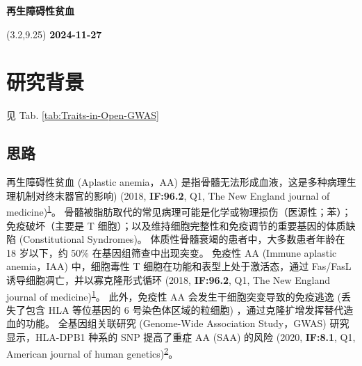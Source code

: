 \documentclass[
]{article}
\author{}
\date{\vspace{-2.5em}}
\begin{document}
\begin{titlepage} 
\begin{center} \textbf{\huge 再生障碍性贫血}
\vspace{4em} \begin{textblock}{10}(3.2,9.25)
\huge \textbf{\textcolor{black}{2024-11-27}}
\end{textblock} \end{center} \end{titlepage}
\restoregeometry


\begin{center}\vspace{1.5cm}\end{center}\tableofcontents

\begin{center}\vspace{1.5cm}\end{center}\listoffigures

\begin{center}\vspace{1.5cm}\end{center}\listoftables

\newpage


\hypertarget{abstract}{%
\section{研究背景}\label{abstract}}

见 Tab. \ref{tab:Traits-in-Open-GWAS}

\hypertarget{introduction}{%
\subsection{思路}\label{introduction}}

再生障碍性贫血 (Aplastic anemia，AA) 是指骨髓无法形成血液，这是多种病理生理机制对终末器官的影响)
(2018, \textbf{IF:96.2}, Q1, The New England journal of medicine)\textsuperscript{\protect\hyperlink{ref-Aplastic_Anemia_Young_2018}{1}}。
骨髓被脂肪取代的常见病理可能是化学或物理损伤（医源性；苯）；免疫破坏（主要是 T 细胞）；以及维持细胞完整性和免疫调节的重要基因的体质缺陷 (Constitutional Syndromes)。
体质性骨髓衰竭的患者中，大多数患者年龄在 18 岁以下，约 50\% 在基因组筛查中出现突变。
免疫性 AA (Immune aplastic anemia，IAA) 中，细胞毒性 T 细胞在功能和表型上处于激活态，通过 Fas/FasL 诱导细胞凋亡，并以寡克隆形式循环 (2018, \textbf{IF:96.2}, Q1, The New England journal of medicine)\textsuperscript{\protect\hyperlink{ref-Aplastic_Anemia_Young_2018}{1}}。
此外，免疫性 AA 会发生干细胞突变导致的免疫逃逸 (丢失了包含 HLA 等位基因的 6 号染色体区域的粒细胞) ，通过克隆扩增发挥替代造血的功能。
全基因组关联研究 (Genome-Wide Association Study，GWAS) 研究显示，HLA-DPB1 种系的 SNP 提高了重症 AA (SAA) 的风险 (2020, \textbf{IF:8.1}, Q1, American journal of human genetics)\textsuperscript{\protect\hyperlink{ref-Genome_wide_Ass_Savage_2020}{2}}。
\end{document}
